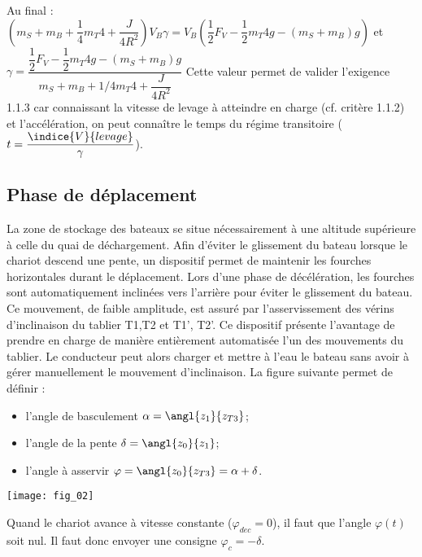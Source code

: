 \begin{multicols}{2}
\begin{corrige}
Au final :
$\left(m_S+m_B+\dfrac{1}{4} m_T4+\dfrac{J}{4R^2 }\right) V_B \gamma=V_B \left(\dfrac{1}{2}F_V-\dfrac{1}{2} m_T4 g-(m_S+m_B )g\right)$
et 
$\gamma =\dfrac{\dfrac{1}{2} F_V-\dfrac{1}{2} m_T4 g-(m_S+m_B )g}{m_S+m_B+1/4 m_T4+\dfrac{J}{4R^2}}$
Cette valeur permet de valider l’exigence 1.1.3 car connaissant la vitesse de levage à atteindre en charge (cf. critère 1.1.2) et l'accélération, on peut connaître le temps du régime transitoire ( $t=\dfrac{\indice{V}{levage}}{\gamma}$).
\end{corrige}
\else
\fi



\subsection*{Phase de déplacement}

\ifprof
\else

La zone de stockage des bateaux se situe nécessairement à une altitude supérieure à celle du quai de déchargement. Afin d’éviter le glissement du bateau lorsque le chariot descend une pente, un dispositif permet de maintenir les fourches horizontales durant le déplacement. Lors d’une phase de décélération, les fourches sont automatiquement inclinées vers l’arrière pour éviter le glissement du bateau. Ce mouvement, de faible amplitude, est assuré par l’asservissement des vérins d’inclinaison du tablier T1,T2 et T1’, T2’. Ce dispositif présente l’avantage de prendre en charge de manière entièrement automatisée l’un des mouvements du tablier. Le conducteur peut alors charger et mettre à l’eau le bateau sans avoir à gérer manuellement le mouvement d’inclinaison.
La figure suivante permet de définir :
\begin{itemize}
\item l'angle de basculement $\alpha=\angl{z_1}{z_{T3}}$;
\item l'angle de la pente $\delta=\angl{z_0}{z_1}$;
\item l'angle à asservir  $\varphi=\angl{z_0}{z_{T3}}=\alpha+\delta$.
\end{itemize}


\begin{center}
\texttt{[image: fig\_02]}
\end{center}
\fi


\ifprof
\begin{corrige}
 Quand le chariot avance à vitesse constante ($\varphi_{dec}=0$), il faut que l'angle $\varphi(t)$ soit nul. Il faut donc envoyer une consigne  $\varphi_c = -\delta$.
\end{corrige}
\else
\fi



\end{multicols}
